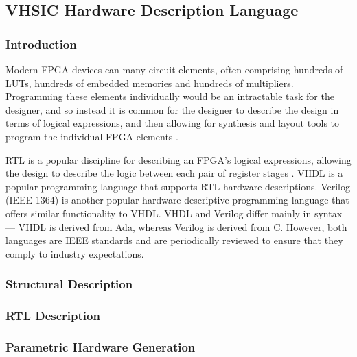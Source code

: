 \subsection{VHSIC Hardware Description Language}
\label{vhdl}

\subsubsection{Introduction}
\label{vhdl:introduction}
Modern \gls{FPGA} devices can many circuit elements, often comprising hundreds
of \glspl{LUT}, hundreds of embedded memories and hundreds of multipliers.
Programming these elements individually would be an intractable task for the
designer, and so instead it is common for the designer to describe the design in
terms of logical expressions, and then allowing for synthesis and layout tools
to program the individual \gls{FPGA} elements \cite{Hauck:2003}.

\gls{RTL} is a popular discipline for describing an \gls{FPGA}'s logical
expressions, allowing the design to describe the logic between each pair of
register stages \cite{Hauck:2003}. \gls{VHDL} is a popular programming language
that supports \gls{RTL} hardware descriptions. Verilog (IEEE 1364) is another
popular hardware descriptive programming language that offers similar
functionality to \gls{VHDL}. \gls{VHDL} and Verilog differ mainly in syntax ---
\gls{VHDL} is derived from Ada, whereas Verilog is derived from C. However, both
languages are \gls{IEEE} standards and are periodically reviewed to ensure that
they comply to industry expectations.

\subsubsection{Structural Description}
\label{vhdl:structuralDescription}

\subsubsection{RTL Description}
\label{vhdl:rtlDescription}

\subsubsection{Parametric Hardware Generation}
\label{vhdl:parametricHardwareGeneration}

